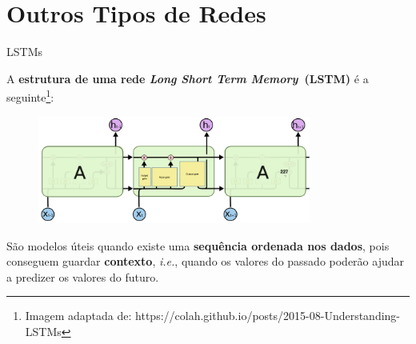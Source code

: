 \section{Outros Tipos de Redes}

\begin{frame}{LSTMs}

A \textbf{estrutura de uma rede \textit{Long Short Term Memory}~(LSTM)} é a seguinte\footnote{\tiny{Imagem adaptada de: https://colah.github.io/posts/2015-08-Understanding-LSTMs}}:

\begin{figure}
    \centering
    \includegraphics[width=0.8\textwidth]{img/LSTM.png}
\end{figure}

\pause

São modelos úteis quando existe uma \textbf{sequência ordenada nos dados}, pois conseguem guardar \textbf{contexto}, \textit{i.e.}, quando os valores do passado poderão ajudar a predizer os valores do futuro.


\end{frame}

